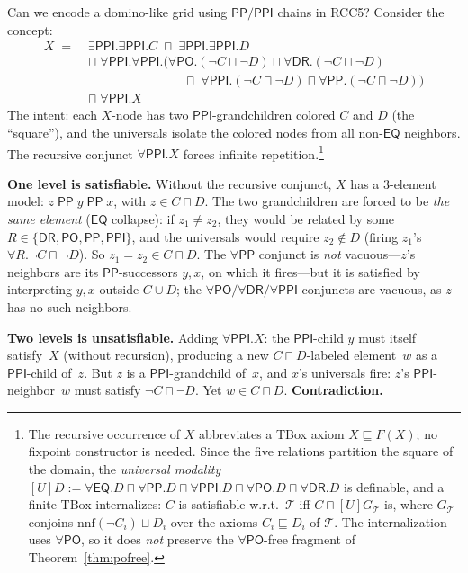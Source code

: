 \documentclass[11pt]{article}
\newcommand{\DR}{\mathsf{DR}}
\newcommand{\PO}{\mathsf{PO}}
\newcommand{\PP}{\mathsf{PP}}
\newcommand{\PPI}{\mathsf{PPI}}
\newcommand{\EQ}{\mathsf{EQ}}
\newcommand{\RCCfive}{\{\DR,\PO,\PP,\PPI\}}
\theoremstyle{plain}
\theoremstyle{definition}
\begin{document}
Can we encode a domino-like grid using $\PP/\PPI$ chains in RCC5?
Consider the concept:
\begin{align*}
  X \;=\; &\exists\PPI.\exists\PPI.C \;\sqcap\; \exists\PPI.\exists\PPI.D \\
  &\sqcap\; \forall\PPI.\forall\PPI.(\forall\PO.(\neg C \sqcap \neg D)
    \sqcap \forall\DR.(\neg C \sqcap \neg D) \\
  &\qquad\qquad\qquad\quad\;\;
    \sqcap\; \forall\PPI.(\neg C \sqcap \neg D)
    \sqcap \forall\PP.(\neg C \sqcap \neg D)) \\
  &\sqcap\; \forall\PPI.X
\end{align*}
The intent: each $X$-node has two $\PPI$-grandchildren colored $C$
and $D$ (the ``square''), and the universals isolate the colored
nodes from all non-$\EQ$ neighbors.  The recursive conjunct
$\forall\PPI.X$ forces infinite repetition.\footnote{The recursive
occurrence of $X$ abbreviates a TBox axiom $X\sqsubseteq F(X)$; no fixpoint
constructor is needed. Since the five relations partition the square of the
domain, the \emph{universal modality} $[U]D:=\forall\EQ.D\sqcap\forall\PP.D
\sqcap\forall\PPI.D\sqcap\forall\PO.D\sqcap\forall\DR.D$ is definable, and a
finite TBox internalizes: $C$ is satisfiable w.r.t.\ $\mathcal T$ iff
$C\sqcap[U]G_{\mathcal T}$ is, where $G_{\mathcal T}$ conjoins
$\mathrm{nnf}(\neg C_i)\sqcup D_i$ over the axioms $C_i\sqsubseteq D_i$ of
$\mathcal T$. The internalization uses $\forall\PO$, so it does \emph{not}
preserve the $\forall\PO$-free fragment of Theorem~\ref{thm:pofree}.}

\medskip\noindent\textbf{One level is satisfiable.}
Without the recursive conjunct, $X$ has a 3-element model:
$z \;\PP\; y \;\PP\; x$, with $z \in C \sqcap D$.
The two grandchildren are forced to be \emph{the same element}
($\EQ$ collapse): if $z_1 \neq z_2$, they would be related by
some $R \in \RCCfive$, and the universals would require $z_2 \notin D$
(firing $z_1$'s $\forall R.\neg C \sqcap \neg D$).
So $z_1 = z_2 \in C \sqcap D$. The $\forall\PP$ conjunct is \emph{not}
vacuous---$z$'s neighbors are its $\PP$-successors $y,x$, on which it
fires---but it is satisfied by interpreting $y,x$ outside $C\cup D$; the
$\forall\PO/\forall\DR/\forall\PPI$ conjuncts are vacuous, as $z$ has no
such neighbors.

\medskip\noindent\textbf{Two levels is unsatisfiable.}
Adding $\forall\PPI.X$: the $\PPI$-child $y$ must itself satisfy~$X$
(without recursion), producing a new $C \sqcap D$-labeled element~$w$
as a $\PPI$-child of~$z$.  But $z$ is a $\PPI$-grandchild of~$x$,
and $x$'s universals fire: $z$'s $\PPI$-neighbor~$w$ must satisfy
$\neg C \sqcap \neg D$.  Yet $w \in C \sqcap D$.
\textbf{Contradiction.}
\end{document}
